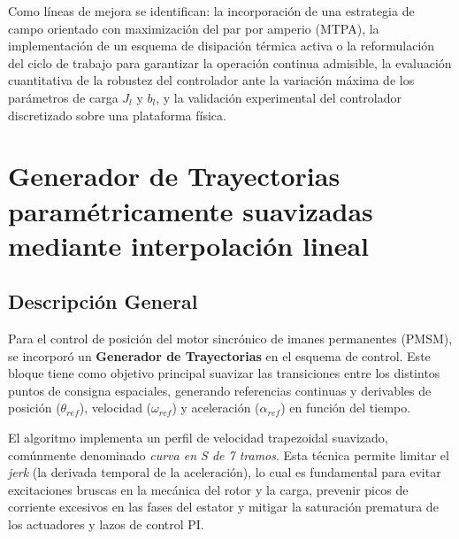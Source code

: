 \documentclass[12pt, a4paper,journal, onecolumn, compsoc]{IEEEtran}
\begin{document}
Como líneas de mejora se identifican: la incorporación de una estrategia de campo orientado con maximización del par por amperio (MTPA), la implementación de un esquema de disipación térmica activa o la reformulación del ciclo de trabajo para garantizar la operación continua admisible, la evaluación cuantitativa de la robustez del controlador ante la variación máxima de los parámetros de carga $J_l$ y $b_l$, y la validación experimental del controlador discretizado sobre una plataforma física.











\appendices
\section{Generador de Trayectorias paramétricamente suavizadas mediante interpolación lineal}
\subsection{Descripción General}
Para el control de posición del motor sincrónico de imanes permanentes (PMSM), se incorporó un \textbf{Generador de Trayectorias} en el esquema de control. Este bloque tiene como objetivo principal suavizar las transiciones entre los distintos puntos de consigna espaciales, generando referencias continuas y derivables de posición ($\theta_{ref}$), velocidad ($\omega_{ref}$) y aceleración ($\alpha_{ref}$) en función del tiempo. 

El algoritmo implementa un perfil de velocidad trapezoidal suavizado, comúnmente denominado \textit{curva en S de 7 tramos}. Esta técnica permite limitar el \textit{jerk} (la derivada temporal de la aceleración), lo cual es fundamental para evitar excitaciones bruscas en la mecánica del rotor y la carga, prevenir picos de corriente excesivos en las fases del estator y mitigar la saturación prematura de los actuadores y lazos de control PI.
\end{document}
